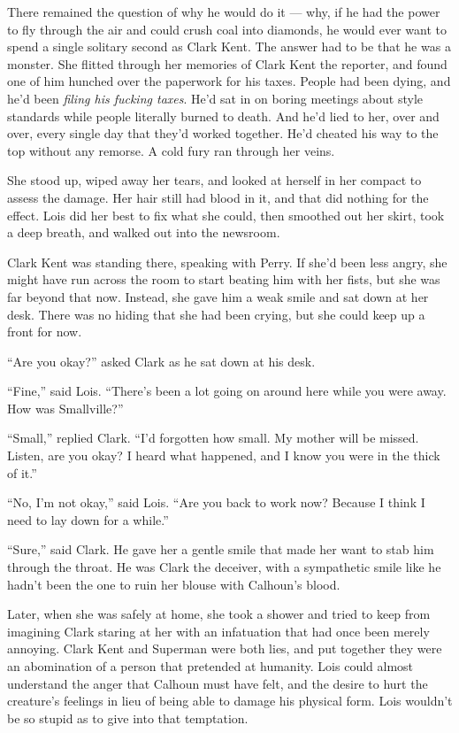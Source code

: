 There remained the question of why he would do it --- why, if he had the
power to fly through the air and could crush coal into diamonds, he
would ever want to spend a single solitary second as Clark Kent. The
answer had to be that he was a monster. She flitted through her memories
of Clark Kent the reporter, and found one of him hunched over the
paperwork for his taxes. People had been dying, and he'd been
\emph{filing his fucking taxes}. He'd sat in on boring meetings about
style standards while people literally burned to death. And he'd lied to
her, over and over, every single day that they'd worked together. He'd
cheated his way to the top without any remorse. A cold fury ran through
her veins.

She stood up, wiped away her tears, and looked at herself in her compact
to assess the damage. Her hair still had blood in it, and that did
nothing for the effect. Lois did her best to fix what she could, then
smoothed out her skirt, took a deep breath, and walked out into the
newsroom.

Clark Kent was standing there, speaking with Perry. If she'd been less
angry, she might have run across the room to start beating him with her
fists, but she was far beyond that now. Instead, she gave him a weak
smile and sat down at her desk. There was no hiding that she had been
crying, but she could keep up a front for now.

``Are you okay?'' asked Clark as he sat down at his desk.

``Fine,'' said Lois. ``There's been a lot going on around here while you
were away. How was Smallville?''

``Small,'' replied Clark. ``I'd forgotten how small. My mother will be
missed. Listen, are you okay? I heard what happened, and I know you were
in the thick of it.''

``No, I'm not okay,'' said Lois. ``Are you back to work now? Because I
think I need to lay down for a while.''

``Sure,'' said Clark. He gave her a gentle smile that made her want to
stab him through the throat. He was Clark the deceiver, with a
sympathetic smile like he hadn't been the one to ruin her blouse with
Calhoun's blood.

Later, when she was safely at home, she took a shower and tried to keep
from imagining Clark staring at her with an infatuation that had once
been merely annoying. Clark Kent and Superman were both lies, and put
together they were an abomination of a person that pretended at
humanity. Lois could almost understand the anger that Calhoun must have
felt, and the desire to hurt the creature's feelings in lieu of being
able to damage his physical form. Lois wouldn't be so stupid as to give
into that temptation.

